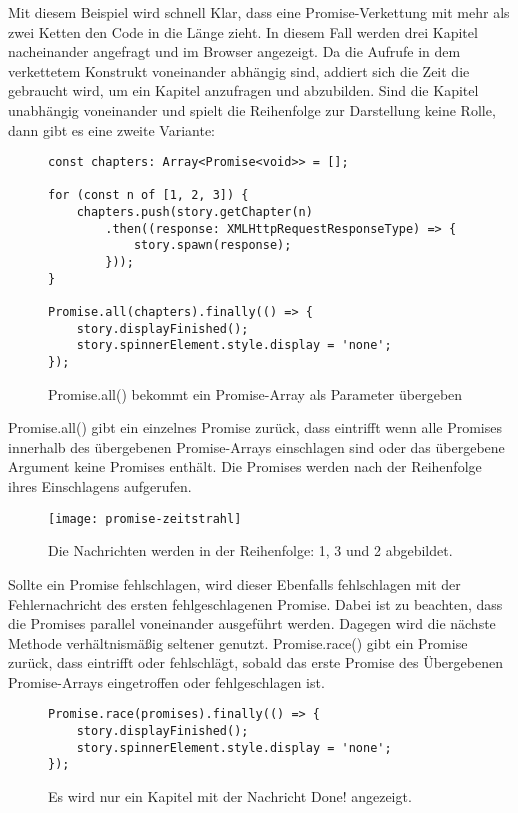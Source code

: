 \noindent
Mit diesem Beispiel wird schnell Klar, dass eine Promise-Verkettung mit mehr als zwei Ketten den Code in die Länge zieht. In diesem Fall werden drei Kapitel nacheinander angefragt und im Browser angezeigt. Da die Aufrufe in dem verkettetem Konstrukt voneinander abhängig sind, addiert sich die Zeit die gebraucht wird, um ein Kapitel anzufragen und abzubilden. Sind die Kapitel unabhängig voneinander und spielt die Reihenfolge zur Darstellung keine Rolle, dann gibt es eine zweite Variante: 

\begin{figure}[H]
\begin{lstlisting}
const chapters: Array<Promise<void>> = [];

for (const n of [1, 2, 3]) {
    chapters.push(story.getChapter(n)
        .then((response: XMLHttpRequestResponseType) => {
            story.spawn(response);
        }));
}

Promise.all(chapters).finally(() => {
    story.displayFinished();
    story.spinnerElement.style.display = 'none';
});
\end{lstlisting}
\caption{Promise.all() bekommt ein Promise-Array als Parameter übergeben}
\end{figure}

\noindent
Promise.all() gibt ein einzelnes Promise zurück, dass eintrifft wenn alle Promises innerhalb des übergebenen Promise-Arrays einschlagen sind oder das übergebene Argument keine Promises enthält. Die Promises werden nach der Reihenfolge ihres Einschlagens aufgerufen.

\begin{figure}[H]
\centering
\texttt{[image: promise-zeitstrahl]}
\caption{Die Nachrichten werden in der Reihenfolge: 1, 3 und 2 abgebildet.}
\end{figure}

\noindent
Sollte ein Promise fehlschlagen, wird dieser Ebenfalls fehlschlagen mit der Fehlernachricht des ersten fehlgeschlagenen Promise.\cite{promise-executor} Dabei ist zu beachten, dass die Promises parallel voneinander ausgeführt werden. Dagegen wird die nächste Methode verhältnismäßig seltener genutzt. Promise.race() gibt ein Promise zurück, dass eintrifft oder fehlschlägt, sobald das erste Promise des Übergebenen Promise-Arrays eingetroffen oder fehlgeschlagen ist.\cite{versprechen}

\begin{figure}[H]
\begin{lstlisting}
Promise.race(promises).finally(() => {
    story.displayFinished();
    story.spinnerElement.style.display = 'none';
});
\end{lstlisting}
\caption{Es wird nur ein Kapitel mit der Nachricht \glqq Done!\grqq{} angezeigt.}
\end{figure}

